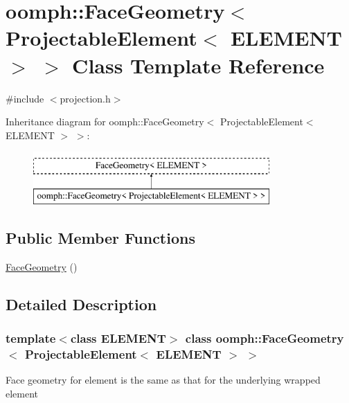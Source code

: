 \hypertarget{classoomph_1_1FaceGeometry_3_01ProjectableElement_3_01ELEMENT_01_4_01_4}{}\section{oomph\+:\+:Face\+Geometry$<$ Projectable\+Element$<$ E\+L\+E\+M\+E\+NT $>$ $>$ Class Template Reference}
\label{classoomph_1_1FaceGeometry_3_01ProjectableElement_3_01ELEMENT_01_4_01_4}


{\ttfamily \#include $<$projection.\+h$>$}

Inheritance diagram for oomph\+:\+:Face\+Geometry$<$ Projectable\+Element$<$ E\+L\+E\+M\+E\+NT $>$ $>$\+:\begin{figure}[H]
\begin{center}
\leavevmode
\includegraphics[height=2.000000cm]{classoomph_1_1FaceGeometry_3_01ProjectableElement_3_01ELEMENT_01_4_01_4}
\end{center}
\end{figure}
\subsection*{Public Member Functions}
\begin{DoxyCompactItemize}
\item 
\hyperlink{classoomph_1_1FaceGeometry_3_01ProjectableElement_3_01ELEMENT_01_4_01_4_a62c7dbbd61666c35f66cb028468bd110}{Face\+Geometry} ()
\end{DoxyCompactItemize}


\subsection{Detailed Description}
\subsubsection*{template$<$class E\+L\+E\+M\+E\+NT$>$\newline
class oomph\+::\+Face\+Geometry$<$ Projectable\+Element$<$ E\+L\+E\+M\+E\+N\+T $>$ $>$}

Face geometry for element is the same as that for the underlying wrapped element 

